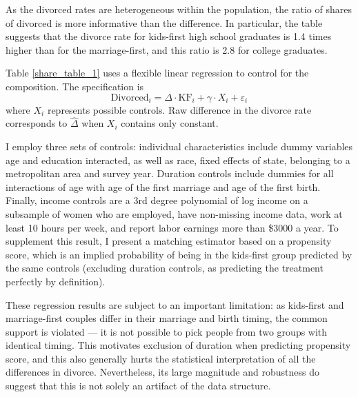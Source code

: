 \documentclass[12pt,letter]{article}
\begin{document}
As the divorced rates are heterogeneous within the population, the ratio of shares of divorced is more informative than the difference. In particular, the table suggests that the divorce rate for kids-first high school graduates is 1.4 times higher than for the marriage-first, and this ratio is 2.8 for college graduates. 

Table \ref{share_table_1} uses a flexible linear regression to control for the composition. The specification is
\[\text{Divorced}_i =\Delta\cdot \text{KF}_i + \gamma \cdot X_i + \varepsilon_i\]
where $X_i$ represents possible controls. Raw difference in the divorce rate corresponds to $\hat\Delta$ when $X_i$ contains only constant.

I employ three sets of controls: individual characteristics include dummy variables age and education interacted, as well as race, fixed effects of state, belonging to a metropolitan area and survey year. Duration controls include dummies for all interactions of age with age of the first marriage and age of the first birth. Finally, income controls are a 3rd degree polynomial of log income on a subsample of women who are employed, have non-missing income data, work at least 10 hours per week, and report labor earnings more than \$3000 a year. To supplement this result, I present a matching estimator based on a propensity score, which is an implied probability of being in the kids-first group predicted by the same controls (excluding duration controls, as predicting the treatment perfectly by definition).
 
These regression results are subject to an important limitation: as kids-first and marriage-first couples differ in their marriage and birth timing, the common support is violated --- it is not possible to pick people from two groups with identical timing. This motivates exclusion of duration when predicting propensity score, and this also generally hurts the statistical interpretation of all the differences in divorce. Nevertheless, its large magnitude and robustness do suggest that this is not solely an artifact of the data structure.
\end{document}
